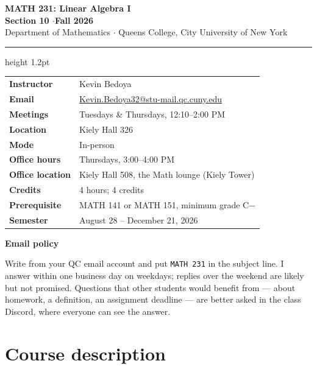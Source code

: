 \documentclass[11pt]{article}
\newenvironment{callout}[1]
  {\par\medskip\needspace{5\baselineskip}%
   \begin{lrbox}{\qcbox}%
   \begin{minipage}{\dimexpr\textwidth-2\fboxsep-4pt}%
   \setlength{\parskip}{0.4em}%
   \textbf{\color{accent}#1}\par}
  {\end{minipage}\end{lrbox}%
   \begin{center}\colorbox{softbg}{\usebox{\qcbox}}\end{center}\medskip}
\newcommand{\officehours}{Thursdays, 3:00--4:00 PM}
\begin{document}
\begin{center}
  {\LARGE\bfseries\color{accent} MATH 231: Linear Algebra I}\\[0.4em]
  {\large\bfseries Section 10 \quad$\cdot$\quad Fall 2026}\\[0.5em]
  {\normalsize Department of Mathematics \quad$\cdot$\quad
   Queens College, City University of New York}
\end{center}

\vspace{0.3em}
{\color{rule}\hrule height 1.2pt}
\vspace{0.9em}

\begin{center}
\renewcommand{\arraystretch}{1.25}
\begin{tabular}{@{}>{\bfseries}l l@{}}
\toprule
Instructor      & Kevin Bedoya \\
Email           & \href{mailto:Kevin.Bedoya32@stu-mail.qc.cuny.edu}{Kevin.Bedoya32@stu-mail.qc.cuny.edu} \\
Meetings        & Tuesdays \& Thursdays, 12:10--2:00 PM \\
Location        & Kiely Hall 326 \\
Mode            & In-person \\
Office hours    & \officehours \\
Office location & Kiely Hall 508, the Math lounge (Kiely Tower) \\
Credits         & 4 hours; 4 credits \\
Prerequisite    & MATH 141 or MATH 151, minimum grade C$-$ \\
Semester        & August 28 -- December 21, 2026 \\
\bottomrule
\end{tabular}
\end{center}

\begin{callout}{Email policy}
Write from your QC email account and put \texttt{MATH 231} in the subject line.
I answer within one business day on weekdays; replies over the weekend are
likely but not promised. Questions that other students would benefit from ---
about homework, a definition, an assignment deadline --- are better asked in
the class Discord, where everyone can see the answer.
\end{callout}

\section{Course description}
\end{document}
